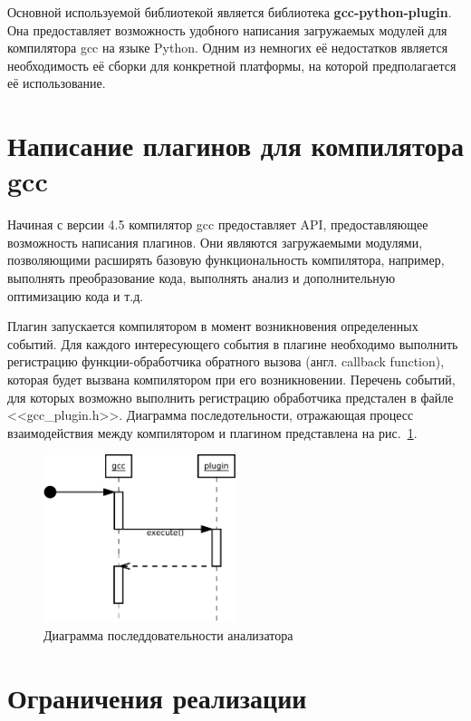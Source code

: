 Основной используемой библиотекой является библиотека \textbf{gcc-python-plugin}. Она предоставляет возможность удобного написания загружаемых модулей для компилятора gcc на языке Python. Одним из немногих её недостатков является необходимость её сборки для конкретной платформы, на которой предполагается её использование.

\section{Написание плагинов для компилятора gcc}

Начиная с версии 4.5 компилятор gcc предоставляет API, предоставляющее возможность написания плагинов. Они являются загружаемыми модулями, позволяющими расширять базовую функциональность компилятора, например, выполнять преобразование кода, выполнять анализ и дополнительную оптимизацию кода и т.д.

Плагин запускается компилятором в момент возникновения определенных событий. Для каждого интересующего события в плагине необходимо выполнить регистрацию функции-обработчика обратного вызова (англ. callback function), которая будет вызвана компилятором при его возникновении. Перечень событий, для которых возможно выполнить регистрацию обработчика предстален в файле <<gcc\_plugin.h>>. Диаграмма последотельности, отражающая процесс взаимодействия между компилятором и плагином представлена на рис.~\ref{fig:sequence}.

\begin{figure}
  \centering
  \includegraphics[width=0.5\textwidth]{inc/dia/sequence}
  \caption{Диаграмма последдовательности анализатора}
  \label{fig:sequence}
\end{figure}

\section{Ограничения реализации}

